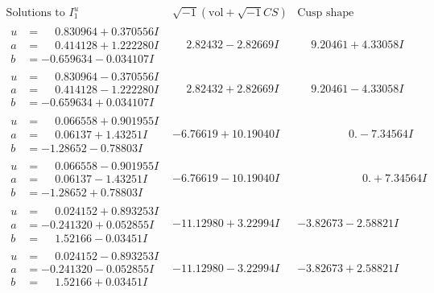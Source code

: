 \documentclass[1p]{elsarticle_modified}
\theoremstyle{definition}
\newcommand{\I}{\sqrt{-1}}
\begin{document}
$$\begin{array}{c|c|c}  
\text{Solutions to }I^u_{1}& \I (\text{vol} + \sqrt{-1}CS) & \text{Cusp shape}\\
 \hline 
\begin{aligned}
u &= \phantom{-}0.830964 + 0.370556 I \\
a &= \phantom{-}0.414128 + 1.222280 I \\
b &= -0.659634 - 0.034107 I\end{aligned}
 & \phantom{-}2.82432 - 2.82669 I & \phantom{-}9.20461 + 4.33058 I \\ \hline\begin{aligned}
u &= \phantom{-}0.830964 - 0.370556 I \\
a &= \phantom{-}0.414128 - 1.222280 I \\
b &= -0.659634 + 0.034107 I\end{aligned}
 & \phantom{-}2.82432 + 2.82669 I & \phantom{-}9.20461 - 4.33058 I \\ \hline\begin{aligned}
u &= \phantom{-}0.066558 + 0.901955 I \\
a &= \phantom{-}0.06137 + 1.43251 I \\
b &= -1.28652 - 0.78803 I\end{aligned}
 & -6.76619 + 10.19040 I & \phantom{-0.000000 } 0. - 7.34564 I \\ \hline\begin{aligned}
u &= \phantom{-}0.066558 - 0.901955 I \\
a &= \phantom{-}0.06137 - 1.43251 I \\
b &= -1.28652 + 0.78803 I\end{aligned}
 & -6.76619 - 10.19040 I & \phantom{-0.000000 -}0. + 7.34564 I \\ \hline\begin{aligned}
u &= \phantom{-}0.024152 + 0.893253 I \\
a &= -0.241320 + 0.052855 I \\
b &= \phantom{-}1.52166 - 0.03451 I\end{aligned}
 & -11.12980 + 3.22994 I & -3.82673 - 2.58821 I \\ \hline\begin{aligned}
u &= \phantom{-}0.024152 - 0.893253 I \\
a &= -0.241320 - 0.052855 I \\
b &= \phantom{-}1.52166 + 0.03451 I\end{aligned}
 & -11.12980 - 3.22994 I & -3.82673 + 2.58821 I \\ \hline\begin{aligned}

\end{aligned}
\end{array}$$
\end{document}
